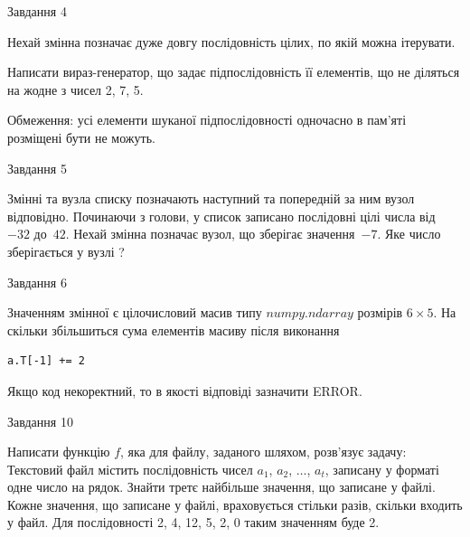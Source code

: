 \documentclass[12pt, ukrainian]{article}
\begin{document}
{               
{\begin{center}Завдання {4}\end{center}}
\vspace{-6mm}
Нехай змінна  позначає дуже довгу послідовність цілих, по якій можна ітерувати.

Написати вираз-генератор, що задає підпослідовність її елементів, що не діляться на жодне з чисел 2, 7, 5.

Обмеження: усі елементи шуканої підпослідовності одночасно в пам'яті розміщені бути не можуть.\par

\vspace{10mm}
               
{\begin{center}Завдання {5}\end{center}}
\vspace{-6mm}
Змінні  та  вузла списку позначають наступний та попередній за ним вузол відповідно. Починаючи з голови, у список записано послідовні цілі числа від~$-32$ до~$42$. Нехай змінна  позначає вузол, що зберігає значення~$-7$.
Яке число зберігається у вузлі  ?\par

               
{\begin{center}Завдання {6}\end{center}}
\vspace{-6mm}
Значенням змінної  є цілочисловий масив типу $numpy.ndarray$ розмірів $6{\times}5$. На скільки збільшиться сума елементів масиву  після виконання
\begin{verbatim}
a.T[-1] += 2
\end{verbatim}


Якщо код некоректний, то в якості відповіді зазначити ERROR.\par

               
{\begin{center}Завдання {10}\end{center}}
\vspace{-6mm}

Написати функцію $f$, яка для файлу, заданого шляхом, розв’язує задачу:\\ Текстовий файл містить послідовність чисел $a_1$, $a_2$, $\ldots$, $a_t$, записану у форматі одне число на рядок. Знайти третє найбільше значення, що записане у файлі. Кожне значення, що записане у файлі, враховується стільки разів, скільки входить у файл. Для послідовності 2, 4, 12, 5, 2, 0 таким значенням буде 2.

}
\end{document}
